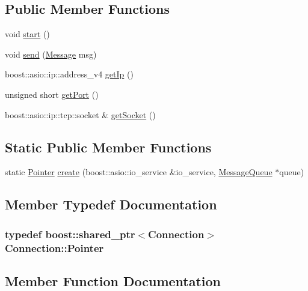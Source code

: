 \subsection*{Public Member Functions}
\begin{DoxyCompactItemize}
\item 
void \hyperlink{class_connection_a47c25a31352a71e2a6902d37fc5fa2ba}{start} ()
\item 
void \hyperlink{class_connection_a484d8c6cc1426b9c00980acdd28c000d}{send} (\hyperlink{class_message}{Message} msg)
\item 
boost\+::asio\+::ip\+::address\+\_\+v4 \hyperlink{class_connection_a1aaf9861212ce321849edac339efed0f}{get\+Ip} ()
\item 
unsigned short \hyperlink{class_connection_a898e60a2d6ec6b8b25e3299bb15972fc}{get\+Port} ()
\item 
boost\+::asio\+::ip\+::tcp\+::socket \& \hyperlink{class_connection_aba7b36e96bdd0b2495b3f8c6850a3ce9}{get\+Socket} ()
\end{DoxyCompactItemize}
\subsection*{Static Public Member Functions}
\begin{DoxyCompactItemize}
\item 
static \hyperlink{class_connection_afc73789251390ec9c9c6e3750b104f08}{Pointer} \hyperlink{class_connection_a55342f6aeedd34fc6a11dd79b59da69b}{create} (boost\+::asio\+::io\+\_\+service \&io\+\_\+service, \hyperlink{class_message_queue}{Message\+Queue} $\ast$queue)
\end{DoxyCompactItemize}


\subsection{Member Typedef Documentation}
\subsubsection[{\texorpdfstring{Pointer}{Pointer}}]{\setlength{\rightskip}{0pt plus 5cm}typedef boost\+::shared\+\_\+ptr$<${\bf Connection}$>$ {\bf Connection\+::\+Pointer}}\hypertarget{class_connection_afc73789251390ec9c9c6e3750b104f08}{}\label{class_connection_afc73789251390ec9c9c6e3750b104f08}


\subsection{Member Function Documentation}
